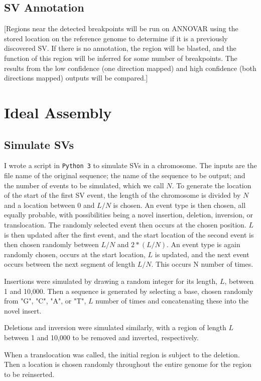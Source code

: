 \documentclass{easychithesis}
\begin{document}
\subsection{SV Annotation}
[Regions near the detected breakpoints will be run on ANNOVAR using the stored location on the reference genome to determine if it is a previously discovered SV. If there is no annotation, the region will be blasted, and the function of this region will be inferred for some number of breakpoints. The results from the low confidence (one direction mapped) and high confidence (both directions mapped) outputs will be compared.]

\section{Ideal Assembly}

\subsection{Simulate SVs}
I wrote a script in \texttt{Python 3} to simulate SVs in a chromosome. The inputs are the file name of the original sequence; the name of the sequence to be output; and the number of events to be simulated, which we call $N$. To generate the location of the start of the first SV event, the length of the chromosome is divided by $N$ and a location between 0 and $L/N$ is chosen. An event type is then chosen, all equally probable, with possibilities being a novel insertion, deletion, inversion, or translocation. The randomly selected event then occurs at the chosen position. $L$ is then updated after the first event, and the start location of the second event is then chosen randomly between $L/N$ and $2*(L/N)$. An event type is again randomly chosen, occurs at the start location, $L$ is updated, and the next event occurs between the next segment of length $L/N$. This occurs N number of times.

Insertions were simulated by drawing a random integer for its length, $L$, between 1 and 10,000. Then a sequence is generated by selecting a base, chosen randomly from "G", "C", "A", or "T", $L$ number of times and concatenating these into the novel insert. 

Deletions and inversion were simulated similarly, with a region of length $L$ between 1 and 10,000 to be removed and inverted, respectively.

When a translocation was called, the initial region is subject to the deletion. Then a location is chosen randomly throughout the entire genome for the region to be reinserted.
\end{document}
